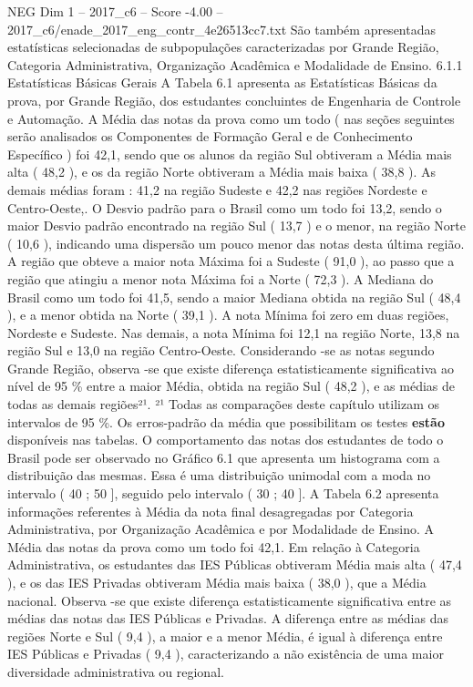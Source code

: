 \begin{textsample}{NEG Dim 1 – 2017\_c6 – Score -4.00 – 2017\_c6/enade\_2017\_eng\_contr\_4e26513cc7.txt}
São também apresentadas estatísticas selecionadas de subpopulações caracterizadas por Grande Região, Categoria Administrativa, Organização Acadêmica e Modalidade de Ensino. 6.1.1 Estatísticas Básicas Gerais A Tabela 6.1 apresenta as Estatísticas Básicas da prova, por Grande Região, dos estudantes concluintes de Engenharia de Controle e Automação.
A Média das notas da prova como um todo ( nas seções seguintes serão analisados os Componentes de Formação Geral e de Conhecimento Específico ) foi 42,1, sendo que os alunos da região Sul obtiveram a Média mais alta ( 48,2 ), e os da região Norte obtiveram a Média mais baixa ( 38,8 ).
As demais médias foram : 41,2 na região Sudeste e 42,2 nas regiões Nordeste e Centro-Oeste,.
O Desvio padrão para o Brasil como um todo foi 13,2, sendo o maior Desvio padrão encontrado na região Sul ( 13,7 ) e o menor, na região Norte ( 10,6 ), indicando uma dispersão um pouco menor das notas desta última região.
A região que obteve a maior nota Máxima foi a Sudeste ( 91,0 ), ao passo que a região que atingiu a menor nota Máxima foi a Norte ( 72,3 ).
A Mediana do Brasil como um todo foi 41,5, sendo a maior Mediana obtida na região Sul ( 48,4 ), e a menor obtida na Norte ( 39,1 ).
A nota Mínima foi zero em duas regiões, Nordeste e Sudeste.
Nas demais, a nota Mínima foi 12,1 na região Norte, 13,8 na região Sul e 13,0 na região Centro-Oeste.
Considerando -se as notas segundo Grande Região, observa -se que existe diferença estatisticamente significativa ao nível de 95 \% entre a maior Média, obtida na região Sul ( 48,2 ), e as médias de todas as demais regiões²¹. ²¹ Todas as comparações deste capítulo utilizam os intervalos de 95 \%.
Os erros-padrão da média que possibilitam os testes \textbf{estão} disponíveis nas tabelas.
O comportamento das notas dos estudantes de todo o Brasil pode ser observado no Gráfico 6.1 que apresenta um histograma com a distribuição das mesmas.
Essa é uma distribuição unimodal com a moda no intervalo ( 40 ; 50 ], seguido pelo intervalo ( 30 ; 40 ].
A Tabela 6.2 apresenta informações referentes à Média da nota final desagregadas por Categoria Administrativa, por Organização Acadêmica e por Modalidade de Ensino.
A Média das notas da prova como um todo foi 42,1.
Em relação à Categoria Administrativa, os estudantes das IES Públicas obtiveram Média mais alta ( 47,4 ), e os das IES Privadas obtiveram Média mais baixa ( 38,0 ), que a Média nacional.
Observa -se que existe diferença estatisticamente significativa entre as médias das notas das IES Públicas e Privadas.
A diferença entre as médias das regiões Norte e Sul ( 9,4 ), a maior e a menor Média, é igual à diferença entre IES Públicas e Privadas ( 9,4 ), caracterizando a não existência de uma maior diversidade administrativa ou regional.

\end{textsample}
